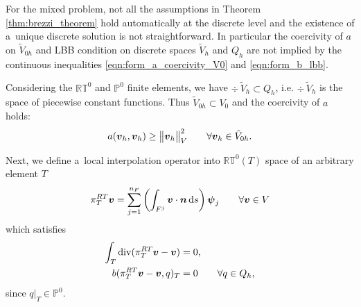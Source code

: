For the mixed problem, not all the assumptions in Theorem \ref{thm:brezzi_theorem}
hold automatically at the discrete level and the existence of a~unique discrete solution is not straightforward.
In particular the coercivity of $a$ on $\tilde V_{0h}$
and LBB condition on discrete spaces $\tilde V_h$ and $Q_h$ are not implied by the continuous inequalities
\eqref{eqn:form_a_coercivity_V0} and \eqref{eqn:form_b_lbb}.

Considering the $\mathbb{RT}^0$ and $\mathbb P^0$ finite elements,
we have $\div\,\tilde V_{h}\subset Q_h$, i.e. $\div\, \tilde V_h$ is the space of piecewise constant functions.
Thus $\tilde V_{0h} \subset V_0$ and the coercivity of $a$ holds:
\begin{equation} \label{eqn:form_a_discrete_coercivity}
a(\mathbf{\boldsymbol{v}}_h,\mathbf{\boldsymbol{v}}_h)\geq \bigl\Vert\mathbf{\boldsymbol{v}}_h\bigr\Vert^2_V  \qquad \forall \mathbf{\boldsymbol{v}}_h\in \tilde V_{0h}.
\end{equation}


Next, we define a~local interpolation operator into $\mathbb{RT}^0(T)$ space of an arbitrary element $T$
\begin{equation}
    \pi^{RT}_T\mathbf{\boldsymbol{v}} = \sum_{j=1}^{n_F} \left( \int_{F^j} \mathbf{\boldsymbol{v}} \cdot \mathbf{\boldsymbol{n}} \,{\rm d} s \right)  \mathbf{\boldsymbol{\psi}}_j
    \qquad \forall \mathbf{\boldsymbol{v}} \in V \label{eqn:local_rt_interpolator}
\end{equation}
which satisfies
\begin{align}
\int_T {\rm div}(\pi^{RT}_T\mathbf{\boldsymbol{v}}- \mathbf{\boldsymbol{v}}) &= 0, \\
b(\pi^{RT}_T\mathbf{\boldsymbol{v}}- \mathbf{\boldsymbol{v}}, q)_T &= 0 \qquad \forall q\in Q_h, \label{eqn:b_loc_operator_orthogonality}
\end{align}
since $q|_T\in \mathbb{P}^0$.


